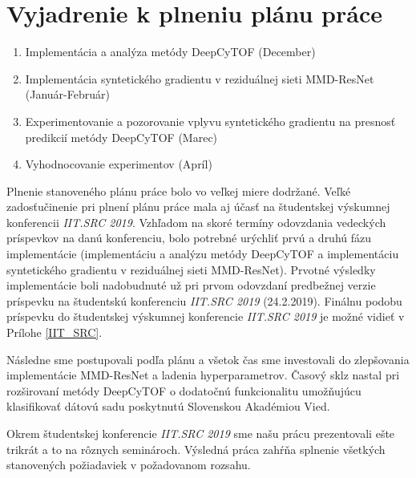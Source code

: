 \chapter{Vyjadrenie k plneniu plánu práce}
\begin{enumerate}
    \item Implementácia a analýza metódy DeepCyTOF (December)
    \item Implementácia syntetického gradientu v reziduálnej sieti MMD-ResNet (Január-Február)
    \item Experimentovanie a pozorovanie vplyvu syntetického gradientu na presnosť predikcií metódy DeepCyTOF (Marec)
    \item Vyhodnocovanie experimentov (Apríl)
\end{enumerate}

Plnenie stanoveného plánu práce bolo vo veľkej miere dodržané. Veľké zadosťučinenie pri plnení plánu práce mala aj účasť na študentskej výskumnej konferencii \textit{IIT.SRC 2019}. Vzhľadom na skoré termíny odovzdania vedeckých príspevkov na danú konferenciu, bolo potrebné urýchliť prvú a druhú fázu implementácie (implementáciu a analýzu metódy DeepCyTOF a implementáciu syntetického gradientu v reziduálnej sieti MMD-ResNet). Prvotné výsledky implementácie boli nadobudnuté už pri prvom odovzdaní predbežnej verzie príspevku na študentskú konferenciu \textit{IIT.SRC 2019} (24.2.2019). Finálnu podobu príspevku do študentskej výskumnej konferencie \textit{IIT.SRC 2019} je možné vidieť v Prílohe \ref{IIT_SRC}.

Následne sme postupovali podľa plánu a všetok čas sme investovali do zlepšovania implementácie MMD-ResNet a ladenia hyperparametrov. Časový sklz nastal pri rozširovaní metódy DeepCyTOF o dodatočnú funkcionalitu umožňujúcu klasifikovať dátovú sadu poskytnutú Slovenskou Akadémiou Vied.

Okrem študentskej konferencie \textit{IIT.SRC 2019} sme našu prácu prezentovali ešte trikrát a to na rôznych seminároch. Výsledná práca zahŕňa splnenie všetkých stanovených požiadaviek v požadovanom rozsahu.






